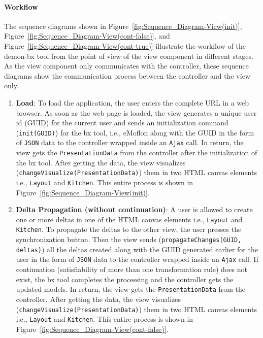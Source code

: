 \paragraph{Workflow}
The sequence diagrams shown in Figure~\ref{fig:Sequence_Diagram-View(init)}, Figure~\ref{fig:Sequence_Diagram-View(cont-false)}, and Figure~\ref{fig:Sequence_Diagram-View(cont-true)} illustrate the workflow of the demon-bx tool from the point of view of the view component in different stages. As the view component only communicates with the controller, these sequence diagrams show the communication process between the controller and the view only.

\begin{enumerate}
	\item {\textbf{Load}: To load the application, the user enters the complete URL in a web browser. As soon as the web page is loaded, the view generates a unique user id (GUID) for the current user and sends an initialization command (\texttt{init(GUID)}) for the bx tool, i.e., eMoflon along with the GUID in the form of \texttt{JSON} data to the controller wrapped inside an \texttt{Ajax} call. In return, the view gets the \texttt{PresentationData} from the controller after the initialization of the bx tool. After getting the data, the view visualizes (\texttt{changeVisualize(PresentationData)}) them in two HTML canvas elements i.e., \texttt{Layout} and \texttt{Kitchen}. This entire process is shown in Figure~\ref{fig:Sequence_Diagram-View(init)}.}
	
	\item {\textbf{Delta Propagation (without continuation)}: A user is allowed to create one or more deltas in one of the HTML canvas elements i.e., \texttt{Layout} and \texttt{Kitchen}. To propagate the deltas to the other view, the user presses the synchronization button. Then the view sends (\texttt{propagateChanges(GUID, deltas)}) all the deltas created along with the GUID generated earlier for the user in the form of \texttt{JSON} data to the controller wrapped inside an \texttt{Ajax} call. If continuation (satisfiability of more than one transformation rule) does not exist, the bx tool completes the processing and the controller gets the updated models. In return, the view gets the \texttt{PresentationData} from the controller. After getting the data, the view visualizes (\texttt{changeVisualize(PresentationData)}) them in two HTML canvas elements i.e., \texttt{Layout} and \texttt{Kitchen}. This entire process is shown in Figure~\ref{fig:Sequence_Diagram-View(cont-false)}.}
	

\end{enumerate}
